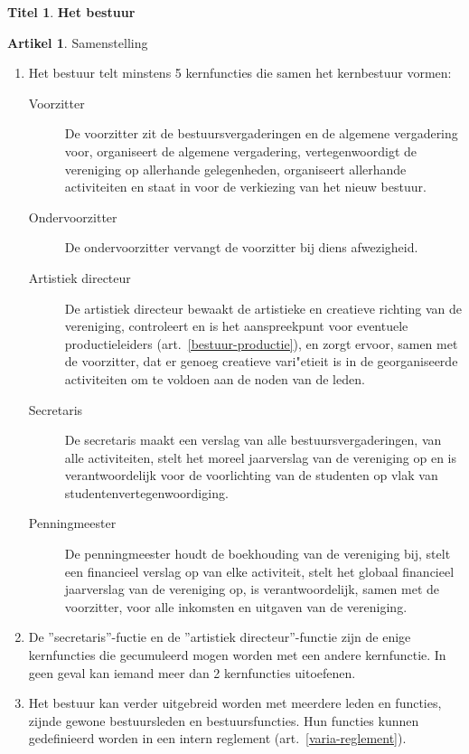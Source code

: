 \documentclass[a4paper,10pt]{article}
\theoremstyle{definition}
\newtheorem{titel}{\newline\Large Titel}
\newtheorem{artikelbase}{\large Artikel}
\newenvironment{artikel}
  {\begin{artikelbase}}
  {\smallskip
   \end{artikelbase}}
\newcommand{\ttext}[1]{\Large \textbf{#1} \normalsize}
\newcommand{\ttextenum}{\mbox{}}
\begin{document}
\begin{titel}\ttext{Het bestuur}

  \begin{artikel}Samenstelling\ttextenum
    \begin{enumerate}
      \item Het bestuur telt minstens 5 kernfuncties die samen het kernbestuur vormen:
      \begin{description}
        \item[Voorzitter]
          De voorzitter zit de bestuursvergaderingen en de algemene vergadering voor, organiseert de algemene vergadering, vertegenwoordigt de vereniging op allerhande gelegenheden, organiseert allerhande activiteiten en staat in voor de verkiezing van het nieuw bestuur.
        \item[Ondervoorzitter]
          De ondervoorzitter vervangt de voorzitter bij diens afwezigheid.
        \item[Artistiek directeur]
          De artistiek directeur bewaakt de artistieke en creatieve richting van de vereniging, controleert en is het aanspreekpunt voor eventuele productieleiders (art.~\ref{bestuur-productie}), en zorgt ervoor, samen met de voorzitter, dat er genoeg creatieve vari"etieit is in de georganiseerde activiteiten om te voldoen aan de noden van de leden.
        \item[Secretaris]
          De secretaris maakt een verslag van alle bestuursvergaderingen, van alle activiteiten, stelt het moreel jaarverslag van de vereniging op en is verantwoordelijk voor de voorlichting van de studenten op vlak van studentenvertegenwoordiging.
        \item[Penningmeester]
          De penningmeester houdt de boekhouding van de vereniging bij, stelt een financieel verslag op van elke activiteit, stelt het globaal financieel jaarverslag van de vereniging op, is verantwoordelijk, samen met de voorzitter, voor alle inkomsten en uitgaven van de vereniging.
      \end{description}

      \item
        De ''secretaris''-fuctie en de ''artistiek directeur''-functie zijn de enige kernfuncties die gecumuleerd mogen worden met een andere kernfunctie.
        In geen geval kan iemand meer dan 2 kernfuncties uitoefenen.
      \item Het bestuur kan verder uitgebreid worden met meerdere leden en functies, zijnde gewone bestuursleden en bestuursfuncties.
        Hun functies kunnen gedefinieerd worden in een intern reglement (art.~\ref{varia-reglement}).
    \end{enumerate}
  \end{artikel}


\end{titel}
\end{document}
